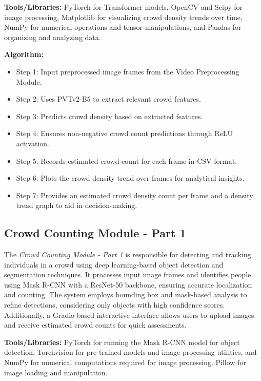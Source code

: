 \documentclass[11pt]{report}
\begin{document}
\textbf{Tools/Libraries:} PyTorch for Transformer models, OpenCV and Scipy for image processing, Matplotlib  for visualizing crowd density trends over time, NumPy for numerical operations and tensor manipulations, and Pandas for organizing and analyzing data. 

\textbf{Algorithm:}
\begin{itemize}
  \item Step 1: Input preprocessed image frames from the Video Preprocessing Module.
  \item Step 2: Uses PVTv2-B5 to extract relevant crowd features.
  \item Step 3: Predicts crowd density based on extracted features.
  \item Step 4: Ensures non-negative crowd count predictions through ReLU activation.
  \item Step 5: Records estimated crowd count for each frame in CSV format.
  \item Step 6: Plots the crowd density trend over frames for analytical insights.
  \item Step 7: Provides an estimated crowd density count per frame and a density trend graph to aid in decision-making.
\end{itemize}


\subsection{Crowd Counting Module - Part 1}
The \textit{Crowd Counting Module - Part 1} is responsible for detecting and tracking individuals in a crowd using deep learning-based object detection and segmentation techniques. It processes input image frames and identifies people using Mask R-CNN with a ResNet-50 backbone, ensuring accurate localization and counting. The system employs bounding box and mask-based analysis to refine detections, considering only objects with high confidence scores. Additionally, a Gradio-based interactive interface allows users to upload images and receive estimated crowd counts for quick assessments.

\textbf{Tools/Libraries:} PyTorch for running the Mask R-CNN model for object detection, Torchvision for pre-trained models and image processing utilities, and NumPy for numerical computations required for image processing. Pillow for image loading and manipulation.
\end{document}
